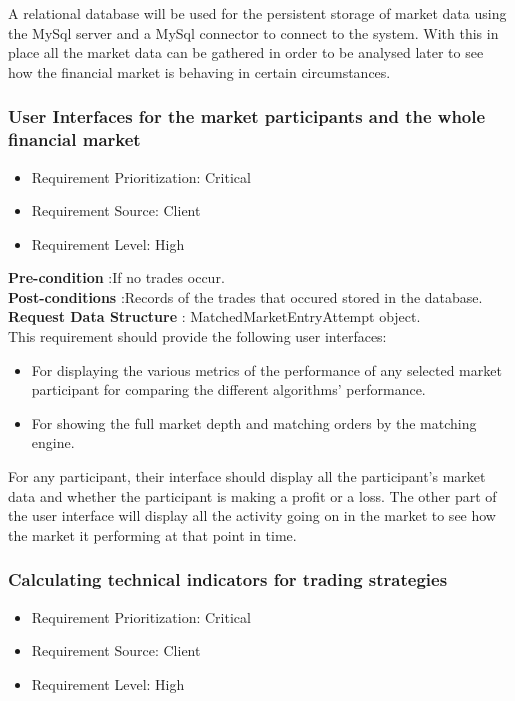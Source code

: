 \documentclass[12pt]{article}
\begin{document}
								A relational database will be used for the persistent storage of market data using the MySql server and a MySql connector to connect to the system. With this in place all the market data can be gathered in order to be analysed later to see how the financial market is behaving in certain circumstances.
								
				\subsubsection{User Interfaces for the market participants and the whole financial market}
								\begin{itemize}
									\item Requirement Prioritization: Critical
									\item Requirement Source: Client 
									\item Requirement Level: High	
								\end{itemize}
								
								\textbf{Pre-condition} :If no trades occur.\\
								\textbf{Post-conditions} :Records of the trades that occured stored in the database.\\ 
								\textbf{Request Data Structure} : MatchedMarketEntryAttempt object.\\
									
								This requirement should provide the following user interfaces:
									\begin{itemize}
										\item  For displaying the various metrics of the performance of any selected market participant for comparing the different algorithms' performance.
										\item For showing the full market depth and matching orders by the matching engine.
									\end{itemize}
									
									For any participant, their interface should display all the participant's market data and whether the participant is making a profit or a loss. 
									The other part of the user interface will display all the activity going on in the market to see how the market it performing at that point in time.								
					
				\subsubsection{Calculating technical indicators for trading strategies}
						\begin{itemize}
							\item Requirement Prioritization: Critical
							\item Requirement Source: Client
							\item Requirement Level: High 	
						\end{itemize}
						
\end{document}
